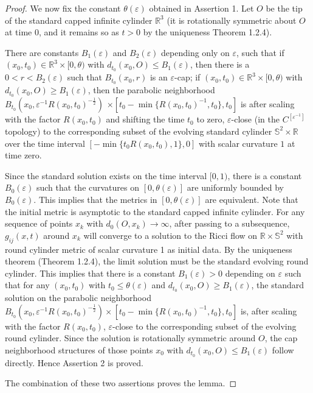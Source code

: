 \begin{proof}
We now fix the constant $\theta(\varepsilon)$ obtained in
Assertion 1. Let $O$ be the tip of the standard capped infinite
cylinder $\mathbb{R}^3$ (it is rotationally symmetric about $O$ at
time $0$, and it remains so as $t>0$ by the uniqueness Theorem
1.2.4).

\begin{proposition}
  \label{prop:cz-standard-solution-early-time-cap-neck}

There are constants $B_1(\varepsilon)$ and $B_2(\varepsilon)$
depending only on $\varepsilon$, such that if $(x_0,t_0)\in
\mathbb{R}^3\times [0,\theta)$ with $d_{t_0}(x_0,O)\leq
B_{1}(\varepsilon)$, then there is a $0<r<B_2(\varepsilon)$ such
that $B_{t_0}(x_0,r)$ is an $\varepsilon$-cap; if $(x_0,t_0)\in
\mathbb{R}^3\times [0,\theta)$ with $d_{t_0}(x_0,O)\geq
B_1(\varepsilon)$, then the parabolic neighborhood
$B_{t_0}(x_0,\varepsilon^{-1}R(x_0,t_0)^{-\frac{1}{2}})$ $\times
[t_0-\min \{R(x_0,t_0)^{-1},t_0\},t_0]$ is after scaling with the
factor $R(x_0,t_0)$ and shifting the time $t_0$ to zero,
$\varepsilon$-close (in the $C^{[\varepsilon^{-1}]}$ topology) to
the corresponding subset of the evolving standard cylinder
$\mathbb{S}^2 \times \mathbb{R}$ over the time interval $[-\min
\{t_0R(x_0,t_0),1\},0]$ with scalar curvature $1$ at time zero.
\end{proposition}

Since the standard solution exists on the time interval $[0,1)$,
there is a constant $B_{0}(\varepsilon)$ such that the curvatures
on $[0,\theta(\varepsilon)]$ are uniformly bounded by
$B_{0}(\varepsilon)$. This implies that the metrics in
$[0,\theta(\varepsilon)]$ are equivalent.  Note that the initial
metric is asymptotic to the standard capped infinite cylinder. For
any sequence of points $x_{k}$ with $d_{0}(O,x_{k})\rightarrow
\infty$, after passing to a subsequence, $g_{ij}(x,t)$ around
$x_{k}$ will converge to a solution to the Ricci flow on
$\mathbb{R}\times \mathbb{S}^{2}$ with round cylinder metric of
scalar curvature 1 as initial data. By the uniqueness theorem
(Theorem 1.2.4), the limit solution must be the standard evolving
round cylinder.  This implies that there is a constant
$B_{1}(\varepsilon)>0$ depending on $\varepsilon$ such that for
any $(x_0,t_0)$ with $t_0\leq \theta(\varepsilon)$ and
$d_{t_0}(x_0,O)\geq B_{1}(\varepsilon)$, the standard solution on
the parabolic neighborhood
$B_{t_0}(x_0,\varepsilon^{-1}R(x_0,t_0)^{-\frac{1}{2}}) \times
[t_0-\min \{R(x_0,t_0)^{-1},t_0\},t_0]$ is, after scaling with the
factor $R(x_0,t_0)$, $\varepsilon$-close to the corresponding
subset of the evolving round cylinder. Since the solution is
rotationally symmetric around $O$, the cap neighborhood structures
of those points $x_0$ with $d_{t_0}(x_0,O)\leq B_{1}(\varepsilon)$
follow directly. Hence Assertion 2 is proved.

The combination of these two assertions proves the lemma.
\end{proof}

